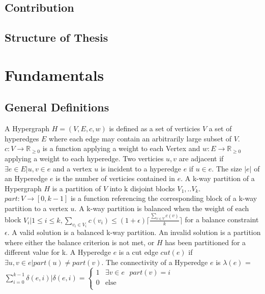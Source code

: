 \documentclass[a4paper,12pt,bibtotoc,titlepage, liststotoc,BCOR7mm,headsepline,pointlessnumbers]{scrbook}
\numberwithin{equation}{section}
\begin{document}
\section{Contribution}
\section{Structure of Thesis}
\chapter{Fundamentals}
\section{General Definitions}
A Hypergraph $H = (V, E, c, w)$ is defined as a set of verticies $V$ a set of hyperedges $E$ where each edge may contain an arbitrarily large subset of $V$.
$c: V \rightarrow  \mathbb R_{\ge 0}$ is a function applying a weight to each Vertex and $w: E \rightarrow  \mathbb R_{\ge 0}$ applying a weight to each hyperedge. 
Two verticies $u, v$ are adjacent if $\exists e \in E | u, v \in e$ and a vertex $u$ is incident to a hyperedge $e$ if $ u \in e$. The size $|e|$ of an Hyperedge $e$ is the number of verticies contained in $e$. A k-way partition of a Hypergraph $H$ is a partition of $V$ into k disjoint blocks $V_1, .. V_k$. $part: V \rightarrow [0, k-1]$ is a function referencing the corresponding block of a k-way partition to a vertex $u$. 
A k-way partition is balanced when the weight of each block $V_i | 1 \le i \le k, \sum_{v_i \in V_i} c(v_i) \le (1 + \epsilon) \lceil \frac{\sum_{v \in V} c(v)}{k} \rceil $  for a balance constraint $\epsilon$.
A valid solution is a balanced k-way partition. An invalid solution is a partition where either the balance criterion is not met, or $H$ has been partitioned for a different value for k.
A Hyperedge $e$ is a cut edge $cut(e)$ if $\exists u,v \in e | part(u) \neq part(v)$. The connectivity of a Hyperedge $e$ is $\lambda(e)$ = $\sum_{i=0}^{k-1} \delta(e,i) | \delta(e, i) = 
     \begin{cases}
       \text{1} &\exists v \in e\text{ }part(v)=i\\
       \text{0} &\text{else}\\
     \end{cases}$ 
\end{document}
